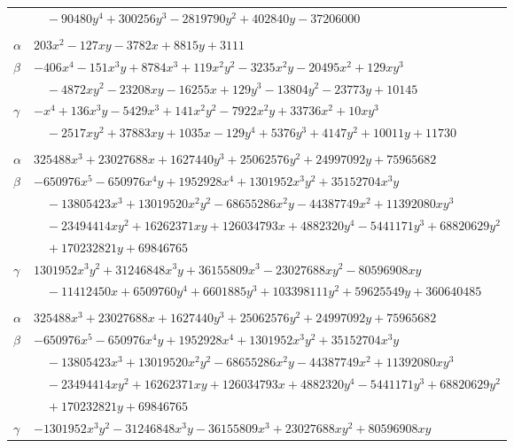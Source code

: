 \documentclass[11pt]{article}
\begin{document}
\begin{longtable}{@{}ll@{}}
 & $\quad -90480y^{4}+300256y^{3}-2819790y^{2}+402840y-37206000$\\
\addlinespace[3pt]
\multicolumn{2}{@{}l}{$\{i,j\}=\{15,77\}$, $k_{ij}=2\cdot 3\cdot 13\cdot 31^{2}$}\\
$\alpha$ & $203x^{2}-127xy-3782x+8815y+3111$\\
$\beta$ & $-406x^{4}-151x^{3}y+8784x^{3}+119x^{2}y^{2}-3235x^{2}y-20495x^{2}+129xy^{3}$\\
 & $\quad -4872xy^{2}-23208xy-16255x+129y^{3}-13804y^{2}-23773y+10145$\\
$\gamma$ & $-x^{4}+136x^{3}y-5429x^{3}+141x^{2}y^{2}-7922x^{2}y+33736x^{2}+10xy^{3}$\\
 & $\quad -2517xy^{2}+37883xy+1035x-129y^{4}+5376y^{3}+4147y^{2}+10011y+11730$\\
\addlinespace[3pt]
\multicolumn{2}{@{}l}{$\{i,j\}=\{15,89\}$, $k_{ij}=2\cdot 3^{3}\cdot 7\cdot 13^{3}\cdot 31^{2}$}\\
$\alpha$ & $325488x^{3}+23027688x+1627440y^{3}+25062576y^{2}+24997092y+75965682$\\
$\beta$ & $-650976x^{5}-650976x^{4}y+1952928x^{4}+1301952x^{3}y^{2}+35152704x^{3}y$\\
 & $\quad -13805423x^{3}+13019520x^{2}y^{2}-68655286x^{2}y-44387749x^{2}+11392080xy^{3}$\\
 & $\quad -23494414xy^{2}+16262371xy+126034793x+4882320y^{4}-5441171y^{3}+68820629y^{2}$\\
 & $\quad +170232821y+69846765$\\
$\gamma$ & $1301952x^{3}y^{2}+31246848x^{3}y+36155809x^{3}-23027688xy^{2}-80596908xy$\\
 & $\quad -11412450x+6509760y^{4}+6601885y^{3}+103398111y^{2}+59625549y+360640485$\\
\addlinespace[3pt]
\multicolumn{2}{@{}l}{$\{i,j\}=\{15,92\}$, $k_{ij}=2\cdot 3^{3}\cdot 7\cdot 13^{3}\cdot 31^{2}$}\\
$\alpha$ & $325488x^{3}+23027688x+1627440y^{3}+25062576y^{2}+24997092y+75965682$\\
$\beta$ & $-650976x^{5}-650976x^{4}y+1952928x^{4}+1301952x^{3}y^{2}+35152704x^{3}y$\\
 & $\quad -13805423x^{3}+13019520x^{2}y^{2}-68655286x^{2}y-44387749x^{2}+11392080xy^{3}$\\
 & $\quad -23494414xy^{2}+16262371xy+126034793x+4882320y^{4}-5441171y^{3}+68820629y^{2}$\\
 & $\quad +170232821y+69846765$\\
$\gamma$ & $-1301952x^{3}y^{2}-31246848x^{3}y-36155809x^{3}+23027688xy^{2}+80596908xy$\\

\end{longtable}
\end{document}
